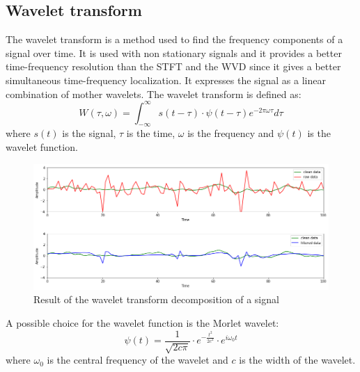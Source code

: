 \documentclass[a4paper, noexaminfo]{sapthesis}
\begin{document}
\subsection{Wavelet transform}\label{sec:wavelet}
The wavelet transform\cite{wavelet} is a method used to find the frequency
components of a signal over time. It is used with non stationary signals and it
provides a better time-frequency resolution than the STFT and the WVD 
since it gives a better simultaneous time-frequency localization. \newline
It expresses the signal as a linear combination of mother wavelets.
The wavelet transform is defined as:
\begin{equation}
\label{eq:wavelet}
W(\tau, \omega) = \int_{-\infty}^{\infty} s(t-\tau) \cdot \psi(t-\tau) e^{-2\pi\omega \tau} d\tau
\end{equation}
where $s(t)$ is the signal, $\tau$ is the time, $\omega$ is the frequency
and $\psi(t)$ is the wavelet function. \newline
\begin{figure}[h]
  \includegraphics[scale=0.45]{wavelet_result}
  \centering
  \caption{Result of the wavelet transform decomposition of a signal
  }\label{fig:wt}
\end{figure}
A possible choice for the wavelet function is the Morlet wavelet:
\begin{equation}
\label{eq:wavelet2}
\psi(t) = \frac{1}{\sqrt{2c\pi}} \cdot e^{-\frac{t^2}{2c^2}} \cdot e^{i\omega_0 t}
\end{equation}
where $\omega_0$ is the central frequency of the wavelet and $c$ is the
width of the wavelet. \newline
\end{document}
